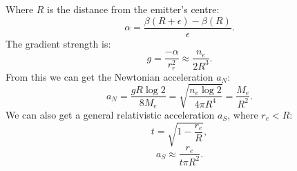 \documentclass[12pt]{article}
\begin{document}
Where $R$ is the distance from the emitter's centre:
\begin{equation}
\alpha = \frac{\beta(R + \epsilon) - \beta(R)}{\epsilon}.
\end{equation}
The gradient strength is:
\begin{equation}
g = \frac{-\alpha}{r_{r}^2} \approx \frac{n_e}{2 R^3}.
\end{equation}
From this we can get the Newtonian acceleration $a_N$:
\begin{equation}
a_N =\frac{g R \log 2}{8 M_{e}} =  \sqrt{\frac{n_e \log 2}{4 \pi R^4}} = \frac{M_{e}}{R^2}.
\end{equation}
We can also get a general relativistic acceleration $a_S$, where $r_e < R$:
\begin{equation}
t = \sqrt{1 - \frac{r_e}{R}},
\end{equation}
\begin{equation}
a_S \approx \frac{r_e}{t \pi R^2}.
\end{equation}
\end{document}
